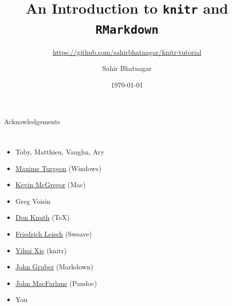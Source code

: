 \documentclass[10pt]{beamer}\usepackage[]{graphicx}\usepackage[]{color}
\date{\today}
\author{Sahir Bhatnagar} %
\institute{McGill Univeristy}
\title{An Introduction to \texttt{knitr} and \texttt{RMarkdown}}
\subtitle{\href{https://github.com/sahirbhatnagar/knitr-tutorial}{https://github.com/sahirbhatnagar/knitr-tutorial}}
\begin{document}
\maketitle %



\begin{frame}{Acknowledgements}
\begin{columns}[c] %


\begin{itemize}
\item Toby, Matthieu, Vaughn, Ary
\item \href{http://turgeonmaxime.github.io/}{Maxime Turgeon} (Windows)
\item \href{https://www.researchgate.net/profile/Kevin_Mcgregor2}{Kevin McGregor} (Mac)
\item Greg Voisin
\item \href{http://www-cs-faculty.stanford.edu/~uno/}{Don Knuth} (\TeX)
\item \href{http://www.statistik.lmu.de/~leisch/}{Friedrich Leisch} (Sweave)
\item \href{http://yihui.name/knitr/}{Yihui Xie} (knitr)
\item \href{http://daringfireball.net/projects/markdown/}{John Gruber} (Markdown)
\item \href{http://pandoc.org/}{John MacFarlane} (Pandoc)
\item You
\end{itemize}


\end{columns}
\end{frame}
\end{document}
